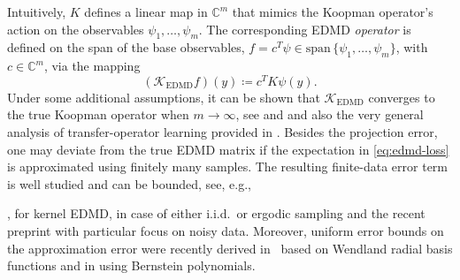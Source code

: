 \documentclass[preprint,12pt,authoryear]{elsarticle}
\newcommand{\C}{\mathbb{C}}
\newcommand\Kc{\mathcal K}
\newcommand\Koopman{\Kc}
\begin{document}
Intuitively, $K$ defines a linear map in $\C^m$ that mimics the Koopman operator's action on the observables $\psi_1,\dots,\psi_m$.
The corresponding EDMD \emph{operator} %
is defined on the span of the base observables, $f = c^T \psi \in \mathrm{span}\, \{\psi_1,\dots,\psi_m\}$, with $c \in \C^m$, via the mapping $$
    (\Koopman_{\text{EDMD}} f)(y) \coloneqq c^T K \psi(y).
$$ 
Under some additional assumptions, it can be shown that $\Koopman_{\text{EDMD}}$ converges to the true Koopman operator when $m \rightarrow \infty$, see \cite{KM18b} and \cite{klus2016convergence} and also the very general analysis of transfer-operator learning provided in \cite{mollenhauer2022kernel,kostic2024sharp,kostic2024consistent}. Besides the projection error, one may deviate from the true EDMD matrix if the expectation in \eqref{eq:edmd-loss} is approximated using finitely many samples. The resulting finite-data error term is well studied and can be bounded, see, e.g., {\cite{Mez22,ZZ22,NPP+23}, \cite{PSW+24} for kernel EDMD, in case of either i.i.d.\ or ergodic sampling and the recent preprint \cite{llamazares2024data} with particular focus on noisy data.
Moreover, uniform error bounds on the approximation error were recently derived in~\cite{KPS+24} based on Wendland radial basis functions and in \cite{yadav2025approximation} using Bernstein polynomials.


}
\end{document}
